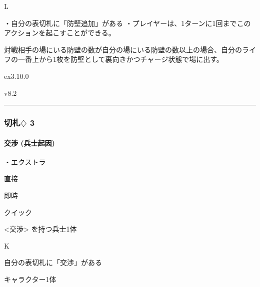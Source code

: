 \documentclass[letterpaper,10pt,dvipdfmx]{sphinxmanual}
\begin{document}
\sphinxAtStartPar
{} L

\sphinxAtStartPar
{}

\sphinxAtStartPar
・自分の表切札に「防壁追加」がある
・プレイヤーは、1ターンに1回までこのアクションを起こすことができる。

\sphinxAtStartPar
{}

\sphinxAtStartPar
対戦相手の場にいる防壁の数が自分の場にいる防壁の数以上の場合、自分のライフの一番上から1枚を防壁として裏向きかつチャージ状態で場に出す。

\sphinxAtStartPar
{}  ex3.10.0

\sphinxAtStartPar
{}  v8.2


\bigskip\hrule\bigskip



\subsubsection{切札{\normalsize $\diamondsuit$} 3}
\label{\detokenize{auto/frameActionlist:id56}}

\paragraph{交渉 (兵士起因)}
\label{\detokenize{auto/frameActionlist:act-negotiate}}\label{\detokenize{auto/frameActionlist:id57}}
\sphinxAtStartPar
{}

\sphinxAtStartPar
・エクストラ

\sphinxAtStartPar
{} 直接

\sphinxAtStartPar
{} 即時

\sphinxAtStartPar
{} クイック

\sphinxAtStartPar
{} \textless{}交渉\textgreater{} を持つ兵士1体

\sphinxAtStartPar
{} K

\sphinxAtStartPar
{}

\sphinxAtStartPar
自分の表切札に「交渉」がある

\sphinxAtStartPar
{}

\sphinxAtStartPar
キャラクター1体

\sphinxAtStartPar
{}
\end{document}
